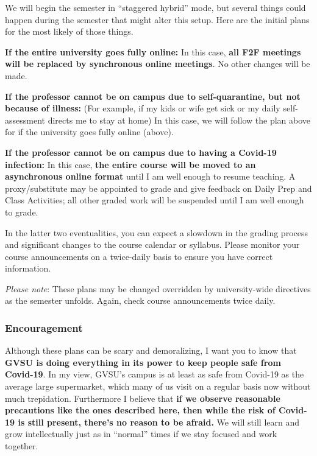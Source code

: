 \documentclass[]{article}
\begin{document}
We will begin the semester in ``staggered hybrid'' mode, but several
things could happen during the semester that might alter this setup.
Here are the initial plans for the most likely of those things.

\textbf{If the entire university goes fully online:} In this case,
\textbf{all F2F meetings will be replaced by synchronous online
meetings}. No other changes will be made.

\textbf{If the professor cannot be on campus due to self-quarantine, but
not because of illness:} (For example, if my kids or wife get sick or my
daily self-assessment directs me to stay at home) In this case, we will
follow the plan above for if the university goes fully online (above).

\textbf{If the professor cannot be on campus due to having a Covid-19
infection:} In this case, \textbf{the entire course will be moved to an
asynchronous online format} until I am well enough to resume teaching. A
proxy/substitute may be appointed to grade and give feedback on Daily
Prep and Class Activities; all other graded work will be suspended until
I am well enough to grade.

In the latter two eventualities, you can expect a slowdown in the
grading process and significant changes to the course calendar or
syllabus. Please monitor your course announcements on a twice-daily
basis to ensure you have correct information.

\emph{Please note}: These plans may be changed overridden by
university-wide directives as the semester unfolds. Again, check course
announcements twice daily.

\hypertarget{encouragement}{%
\subsubsection{Encouragement}\label{encouragement}}

Although these plans can be scary and demoralizing, I want you to know
that \textbf{GVSU is doing everything in its power to keep people safe
from Covid-19}. In my view, GVSU's campus is at least as safe from
Covid-19 as the average large supermarket, which many of us visit on a
regular basis now without much trepidation. Furthermore I believe that
\textbf{if we observe reasonable precautions like the ones described
here, then while the risk of Covid-19 is still present, there's no
reason to be afraid.} We will still learn and grow intellectually just
as in ``normal'' times if we stay focused and work together.
\end{document}
